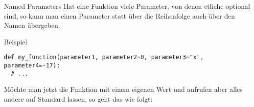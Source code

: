 \begin{fragile}
	
\begin{block}{Named Parameters}
\vspace{2pt}
Hat eine Funktion viele Parameter, von denen etliche optional sind, so kann man einen Parameter statt über die Reihenfolge auch über den Namen übergeben. 
\end{block}

\pause 
\vspace{12pt}

\begin{exampleblock}{Beispiel}
\vspace{2pt}

\begin{verbatim}
def my_function(parameter1, parameter2=0, parameter3="x", parameter4=-17):
  # ... 
\end{verbatim}
Möchte man jetzt die Funktion mit einem eigenen Wert  und  aufrufen aber alles andere auf Standard lassen, so geht das wie folgt: 

\end{exampleblock}

	
\end{fragile}








